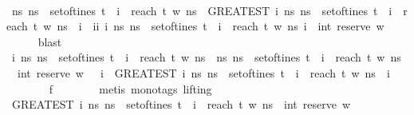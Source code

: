 \begin{isabellebody}
\isanewline
\ \ \ \ \isamarkupfalse%
\ \isamarkupfalse%
\ {\isachardoublequoteopen}{\isacharparenleft}{\isasymforall}ns{\isachardot}\ ns\ {\isasymnotin}\ set{\isacharunderscore}of{\isacharunderscore}tines\ t\ {\isasymor}\ i\ {\isasymnoteq}\ reach\ t\ w\ ns{\isacharparenright}\ {\isasymor}\ {\isacharparenleft}GREATEST\ i{\isachardot}\ {\isasymexists}ns{\isachardot}\ ns\ {\isasymin}\ set{\isacharunderscore}of{\isacharunderscore}tines\ t\ {\isasymand}\ i\ {\isacharequal}\ reach\ t\ w\ ns{\isacharparenright}\ {\isacharequal}\ i\ {\isasymor}\ ii\ {\isacharparenleft}{\isasymlambda}i{\isachardot}\ {\isasymexists}ns{\isachardot}\ ns\ {\isasymin}\ set{\isacharunderscore}of{\isacharunderscore}tines\ t\ {\isasymand}\ i\ {\isacharequal}\ reach\ t\ w\ ns{\isacharparenright}\ i\ {\isacharequal}\ int\ {\isacharparenleft}reserve\ w\ {\isacharbrackleft}{\isacharbrackright}{\isacharparenright}{\isachardoublequoteclose}\isanewline
\ \ \ \ \isamarkupfalse%
\ blast\isanewline
{}\isamarkupfalse%
\isanewline
\ \ \ \ \isamarkupfalse%
\ \isamarkupfalse%
\ {\isachardoublequoteopen}{\isasymAnd}i{\isachardot}\ {\isacharparenleft}{\isasymforall}ns{\isachardot}\ ns\ {\isasymnotin}\ set{\isacharunderscore}of{\isacharunderscore}tines\ t\ {\isasymor}\ i\ {\isasymnoteq}\ reach\ t\ w\ ns{\isacharparenright}\ {\isasymor}\ {\isacharparenleft}{\isasymforall}ns{\isachardot}\ ns\ {\isasymnotin}\ set{\isacharunderscore}of{\isacharunderscore}tines\ t\ {\isasymor}\ i\ {\isasymnoteq}\ reach\ t\ w\ ns{\isacharparenright}\ {\isasymor}\ {\isasymnot}\ int\ {\isacharparenleft}reserve\ w\ {\isacharbrackleft}{\isacharbrackright}{\isacharparenright}\ {\isasymle}\ i\ {\isasymor}\ {\isacharparenleft}GREATEST\ i{\isachardot}\ {\isasymexists}ns{\isachardot}\ ns\ {\isasymin}\ set{\isacharunderscore}of{\isacharunderscore}tines\ t\ {\isasymand}\ i\ {\isacharequal}\ reach\ t\ w\ ns{\isacharparenright}\ {\isacharequal}\ i{\isachardoublequoteclose}\isanewline
\ \ \ \ \ \ \isamarkupfalse%
\ f{}\isanewline
\ \ \ \ \ \ \isamarkupfalse%
\ {\isacharparenleft}metis\ {\isacharparenleft}mono{\isacharunderscore}tags{\isacharcomma}\ lifting{\isacharparenright}{\isacharparenright}\ \ \isanewline
\ \ \ \ \isamarkupfalse%
\ \isamarkupfalse%
\ {\isachardoublequoteopen}{\isacharparenleft}GREATEST\ i{\isachardot}\ {\isasymexists}ns{\isachardot}\ ns\ {\isasymin}\ set{\isacharunderscore}of{\isacharunderscore}tines\ t\ {\isasymand}\ i\ {\isacharequal}\ reach\ t\ w\ ns{\isacharparenright}\ {\isacharequal}\ int\ {\isacharparenleft}reserve\ w\ {\isacharbrackleft}{\isacharbrackright}{\isacharparenright}{\isachardoublequoteclose}\isanewline

\end{isabellebody}
